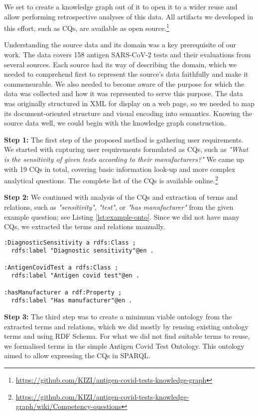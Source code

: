 \documentclass[
]{ceurart}
\begin{document}
We set to create a knowledge graph out of it to open it to a wider reuse and allow performing retrospective analyses of this data.
All artifacts we developed in this effort, such as CQs, are available as open source.\footnote{\url{https://github.com/KIZI/antigen-covid-tests-knowledge-graph}}

Understanding the source data and its domain was a key prerequisite of our work. The data covers 158 antigen SARS-CoV-2 tests and their evaluations from several sources. Each source had its way of describing the domain, which we needed to comprehend first to represent the source's data faithfully and make it commensurable. We also needed to become aware of the purpose for which the data was collected and how it was represented to serve this purpose. The data was originally structured in XML for display on a web page, so we needed to map its document-oriented structure and visual encoding into semantics. Knowing the source data well, we could begin with the knowledge graph construction.

\textbf{Step 1:} The first step of the proposed method is gathering user requirements. We started with capturing user requirements formulated as CQs, such as \textit{"What is the sensitivity of given tests according to their manufacturers?"} We came up with 19 CQs in total, covering basic information look-up and more complex analytical questions. The complete list of the CQs is available online.\footnote{\url{https://github.com/KIZI/antigen-covid-tests-knowledge-graph/wiki/Competency-questions}}

\textbf{Step 2:} We continued with analysis of the CQs and extraction of terms and relations, such as \textit{"sensitivity"}, \textit{"test"}, or \textit{"has manufacturer"} from the given example question; see Listing \ref{lst:example-onto}. Since we did not have many CQs, we extracted the terms and relations manually.

\begin{lstlisting}[language=turtle, caption=Example ontology terms, label={lst:example-onto}]
:DiagnosticSensitivity a rdfs:Class ;
  rdfs:label "Diagnostic sensitivity"@en .

:AntigenCovidTest a rdfs:Class ;
  rdfs:label "Antigen covid test"@en .

:hasManufacturer a rdf:Property ;
  rdfs:label "Has manufacturer"@en .
\end{lstlisting}

\textbf{Step 3:} The third step was to create a minimum viable ontology from the extracted terms and relations, which we did mostly by reusing existing ontology terms and using RDF Schema. For what we did not find suitable terms to reuse, we formalised terms in the simple Antigen Covid Test Ontology. This ontology aimed to allow expressing the CQs in SPARQL.
\end{document}
